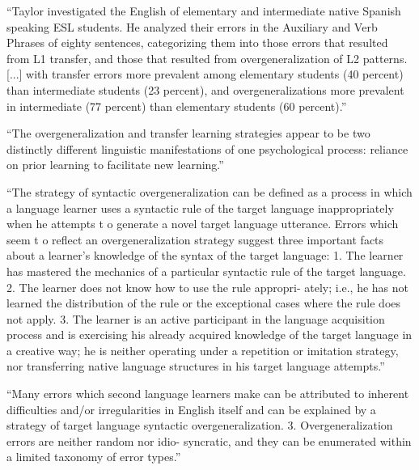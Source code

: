 


``Taylor investigated
the English of elementary and intermediate native Spanish speaking ESL
students. He analyzed their errors in the Auxiliary and Verb Phrases of eighty
sentences, categorizing them into those errors that resulted from L1 transfer,
and those that resulted from overgeneralization of L2 patterns.
[...] with transfer
errors more prevalent among elementary students (40 percent) than
intermediate students (23 percent), and overgeneralizations more prevalent
in intermediate (77 percent) than elementary students (60 percent).''

\cite{Taylor75}
``The overgeneralization and transfer learning strategies
appear to be two distinctly different linguistic manifestations of
one psychological process: reliance on prior learning to facilitate
new learning.''

``The strategy of syntactic overgeneralization can be defined as
a process in which a language learner uses a syntactic rule of the
target language inappropriately when he attempts t o generate a
novel target language utterance. Errors which seem t o reflect an
overgeneralization strategy suggest three important facts about a
learner’s knowledge of the syntax of the target language:
1. The learner has mastered the mechanics of a particular
syntactic rule of the target language.
2. The learner does not know how to use the rule appropri-
ately; i.e., he has not learned the distribution of the rule or the
exceptional cases where the rule does not apply.
3. The learner is an active participant in the language
acquisition process and is exercising his already acquired knowledge
of the target language in a creative way; he is neither operating
under a repetition or imitation strategy, nor transferring native
language structures in his target language attempts.''

``Many errors which second language learners make can be
attributed to inherent difficulties and/or irregularities in English
itself and can be explained by a strategy of target language
syntactic overgeneralization.
3. Overgeneralization errors are neither random nor idio-
syncratic, and they can be enumerated within a limited taxonomy
of error types.''

